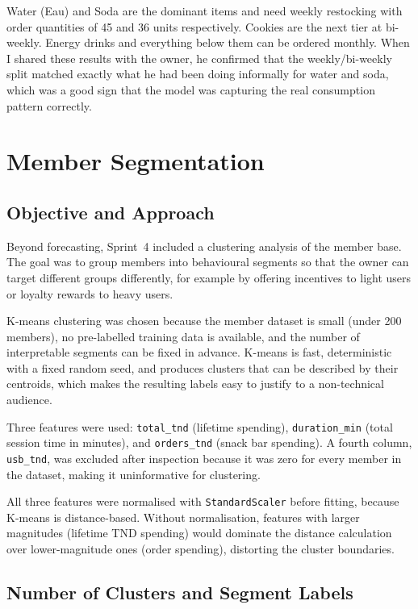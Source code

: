 \documentclass[12pt, a4paper]{report}
\begin{document}
Water (Eau) and Soda are the dominant items and need weekly restocking with order
quantities of 45 and 36 units respectively. Cookies are the next tier at bi-weekly.
Energy drinks and everything below them can be ordered monthly. When I shared these
results with the owner, he confirmed that the weekly/bi-weekly split matched exactly
what he had been doing informally for water and soda, which was a good sign that
the model was capturing the real consumption pattern correctly.

\section{Member Segmentation}

\subsection{Objective and Approach}

Beyond forecasting, Sprint~4 included a clustering analysis of the member base.
The goal was to group members into behavioural segments so that the owner can
target different groups differently, for example by offering incentives to light
users or loyalty rewards to heavy users.

K-means clustering was chosen because the member dataset is small (under 200
members), no pre-labelled training data is available, and the number of
interpretable segments can be fixed in advance. K-means is fast, deterministic
with a fixed random seed, and produces clusters that can be described by their
centroids, which makes the resulting labels easy to justify to a non-technical
audience.

Three features were used: \texttt{total\_tnd} (lifetime spending),
\texttt{duration\_min} (total session time in minutes), and \texttt{orders\_tnd}
(snack bar spending). A fourth column, \texttt{usb\_tnd}, was excluded after
inspection because it was zero for every member in the dataset, making it
uninformative for clustering.

All three features were normalised with \texttt{StandardScaler} before fitting,
because K-means is distance-based. Without normalisation, features with larger
magnitudes (lifetime TND spending) would dominate the distance calculation over
lower-magnitude ones (order spending), distorting the cluster boundaries.

\subsection{Number of Clusters and Segment Labels}
\end{document}
